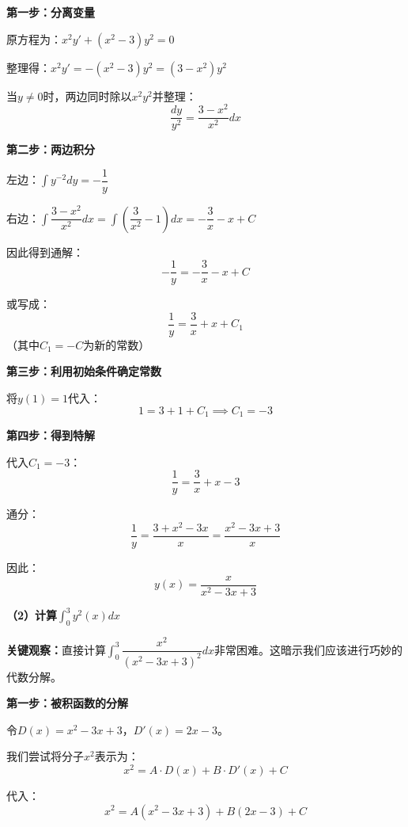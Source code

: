 \documentclass[standard]{ExBook}
\begin{document}
\begin{qitems}
\begin{bbox}
\begin{solution}
            \textbf{第一步：分离变量}
            
            原方程为：$x^2y' + (x^2 - 3)y^2 = 0$
            
            整理得：$x^2 y' = -(x^2 - 3)y^2 = (3 - x^2)y^2$
            
            当$y \ne 0$时，两边同时除以$x^2 y^2$并整理：
            $$\frac{dy}{y^2} = \frac{3 - x^2}{x^2} dx$$
            
            \textbf{第二步：两边积分}
            
            左边：$\int y^{-2} dy = -\dfrac{1}{y}$
            
            右边：$\int \dfrac{3 - x^2}{x^2} dx = \int \left(\dfrac{3}{x^2} - 1\right) dx = -\dfrac{3}{x} - x + C$
            
            因此得到通解：
            $$-\frac{1}{y} = -\frac{3}{x} - x + C$$
            
            或写成：
            $$\frac{1}{y} = \frac{3}{x} + x + C_1$$
            （其中$C_1 = -C$为新的常数）
            
            \textbf{第三步：利用初始条件确定常数}
            
            将$y(1)=1$代入：
            $$1 = 3 + 1 + C_1 \implies C_1 = -3$$
            
            \textbf{第四步：得到特解}
            
            代入$C_1 = -3$：
            $$\frac{1}{y} = \frac{3}{x} + x - 3$$
            
            通分：
            $$\frac{1}{y} = \frac{3 + x^2 - 3x}{x} = \frac{x^2 - 3x + 3}{x}$$
            
            因此：
            $$\boxed{y(x) = \frac{x}{x^2 - 3x + 3}}$$
            
            \textbf{（2）计算$\int_0^3 y^2(x)dx$}
            
            \textbf{关键观察：}直接计算$\int_0^3 \dfrac{x^2}{(x^2 - 3x + 3)^2} dx$非常困难。这暗示我们应该进行巧妙的代数分解。
            
            \textbf{第一步：被积函数的分解}
            
            令$D(x) = x^2 - 3x + 3$，$D'(x) = 2x - 3$。
            
            我们尝试将分子$x^2$表示为：
            $$x^2 = A \cdot D(x) + B \cdot D'(x) + C$$
            
            代入：
            $$x^2 = A(x^2 - 3x + 3) + B(2x - 3) + C$$
            

\end{solution}
\end{bbox}
\end{qitems}
\end{document}

